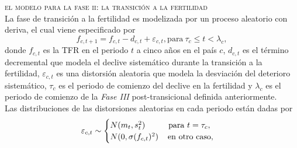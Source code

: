 \textbullet\hspace{0.2cm} \textsc{el modelo para la fase ii: la transición a la fertilidad}\\

La fase de transición a la fertilidad es modelizada por un proceso aleatorio con deriva, el cual viene especificado por
\begin{equation}
f_{c,t+1}=f_{c,t}-d_{c,t}+\varepsilon_{c,t},\text{para}\ \tau_{c}\leq t<\lambda_{c},
\end{equation}
donde $f_{c,t}$ es la TFR en el periodo $t$ a cinco años en el país $c$, $d_{c,t}$ es el término decremental que modela el declive sistemático durante la transición a la fertilidad, $\varepsilon_{c,t}$ es una distorsión aleatoria que modela la desviación del deterioro sistemático, $\tau_{c}$ es el periodo de comienzo del declive en la fertilidad y $\lambda_{c}$ es el periodo de comienzo de la \textit{Fase III} post-transicional definida anteriormente.\\
Las distribuciones de las distorsiones aleatorias en cada periodo están dadas por
\[
  \varepsilon_{c,t}\sim\begin{cases}
             N(m_{t},s_{t}^{2}) \hspace{1cm} \text{para}\ t=\tau_{c},\\
             N(0, \sigma(f_{c,t})^{2}) \hspace{0.4cm} \text{en otro caso},
            \end{cases}
\]

